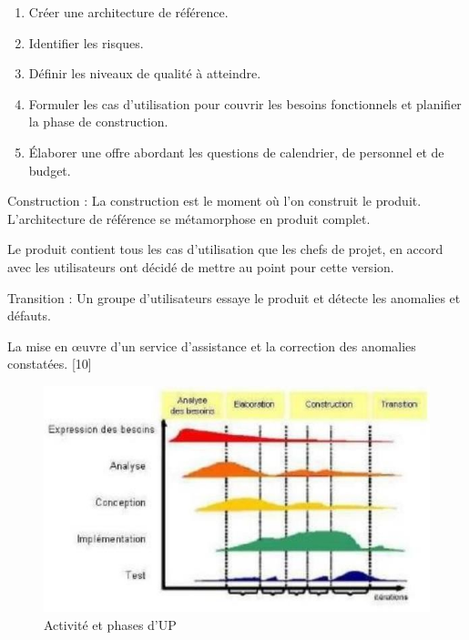 \documentclass[12pt,a4paper]{report}
\begin{document}
\begin{enumerate}
	\item  Cr\'{e}er une architecture de r\'{e}f\'{e}rence.
	
	\item  Identifier les risques.
	
	\item  D\'{e}finir les niveaux de qualit\'{e} \`{a} atteindre.
	
	\item  Formuler les cas d'utilisation pour couvrir les besoins fonctionnels et planifier la phase de construction.
	
	\item  \'{E}laborer une offre abordant les questions de calendrier, de personnel et de budget.
\end{enumerate}

\noindent \begin{flushleft}
	Construction : La construction est le moment o\`{u} l'on construit le produit. L'architecture de r\'{e}f\'{e}rence se m\'{e}tamorphose en produit complet.
	
	\noindent Le produit contient tous les cas d'utilisation que les chefs de projet, en accord avec les utilisateurs ont d\'{e}cid\'{e} de mettre au point pour cette version.
	
	\noindent Transition : Un groupe d'utilisateurs essaye le produit et d\'{e}tecte les anomalies et d\'{e}fauts.
	
	\noindent La mise en {\oe}uvre d'un service d'assistance et la correction des anomalies constat\'{e}es. [10]
	
	\noindent 
\end{flushleft}



\begin{figure}[H]
	\centering
	\includegraphics[width=0.8\linewidth]{image30.png}
	\caption{Activit\'{e} et phases d'UP}
	
\end{figure}
\end{document}
